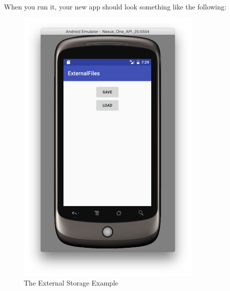 \paragraph{} When you run it, your new app should look something like the following:

\begin{figure}[H]
\centering
\includegraphics[width=0.8\textwidth]{images/externalstorage_avd}
\caption{The External Storage Example}
\label{fig:externalstorage_avd}
\end{figure}


